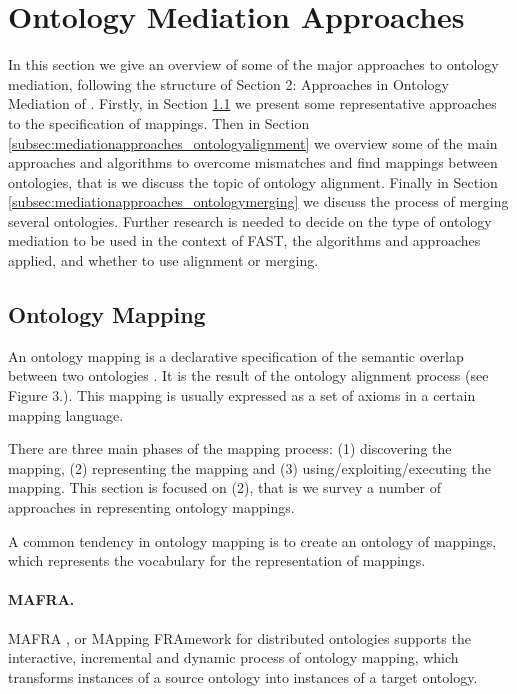 \documentclass{fast_latex}
\begin{document}
\section{Ontology Mediation Approaches}
\label{sec:mediationapproaches}
In this section we give an overview of some of the major approaches to
ontology mediation, following the structure of Section 2: Approaches in
Ontology Mediation of \cite{debruin2005wsml}. Firstly, in Section
\ref{subsec:mediationapproaches_ontologymapping} we present some representative approaches to the specification of
mappings. Then in Section \ref{subsec:mediationapproaches_ontologyalignment} we overview some of the main approaches
and algorithms to overcome mismatches and find mappings between
ontologies, that is we discuss the topic of ontology alignment. Finally
in Section \ref{subsec:mediationapproaches_ontologymerging} we discuss the process of merging several ontologies.
Further research is needed to decide on the type of ontology mediation
to be used in the context of FAST, the algorithms and approaches
applied, and whether to use alignment or merging. 

\subsection{Ontology Mapping}
\label{subsec:mediationapproaches_ontologymapping}
An ontology mapping is a declarative specification of the semantic
overlap between two ontologies \cite{debruin2005wsml}. It is the
result of the ontology alignment process (see Figure 3.). This mapping
is usually expressed as a set of axioms in a certain mapping language. 

There are three main phases of the mapping process: (1) discovering the
mapping, (2) representing the mapping and (3)
using/exploiting/executing the mapping. This section is focused on (2),
that is we survey a number of approaches in representing ontology
mappings. 

A common tendency in ontology mapping is to create an ontology of
mappings, which represents the vocabulary for the representation of
mappings. 

\paragraph{MAFRA.}
MAFRA \cite{maedche2002mafra}, or MApping FRAmework for distributed
ontologies supports the interactive, incremental and dynamic process of
ontology mapping, which transforms instances of a source ontology into
instances of a target ontology. 
\end{document}
